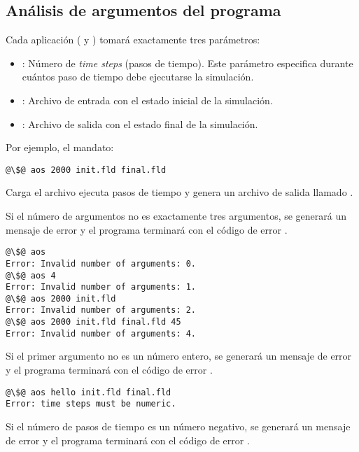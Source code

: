 \subsection{Análisis de argumentos del programa}

Cada aplicación ( y
) tomará exactamente tres parámetros:

\begin{itemize}
\item {}: 
Número de \emph{time steps} (pasos de tiempo). Este parámetro especifica
durante cuántos paso de tiempo debe ejecutarse la simulación.
\item {}: 
Archivo de entrada con el estado inicial de la simulación.
\item {}: 
Archivo de salida con el estado final de la simulación.
\end{itemize}

Por ejemplo, el mandato:

\begin{lstlisting}[style=terminal,escapechar=@]
@\$@ aos 2000 init.fld final.fld
\end{lstlisting}

Carga el archivo  ejecuta  pasos de tiempo y genera
un archivo de salida llamado .

Si el número de argumentos no es exactamente tres argumentos, 
se generará un mensaje de error y el programa terminará con el código de error 
.

\begin{lstlisting}[style=terminal,escapechar=@]
@\$@ aos 
Error: Invalid number of arguments: 0.
@\$@ aos 4
Error: Invalid number of arguments: 1.
@\$@ aos 2000 init.fld
Error: Invalid number of arguments: 2.
@\$@ aos 2000 init.fld final.fld 45
Error: Invalid number of arguments: 4.
\end{lstlisting}

Si el primer argumento no es un número entero,
se generará un mensaje de error y el programa terminará con el código de error 
.

\begin{lstlisting}[style=terminal,escapechar=@]
@\$@ aos hello init.fld final.fld
Error: time steps must be numeric.
\end{lstlisting}

Si el número de pasos de tiempo es un número negativo,
se generará un mensaje de error y el programa terminará con el código de error 
.


